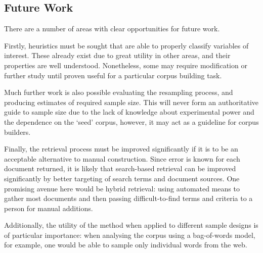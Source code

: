 





%
%




\subsection{Future Work}

There are a number of areas with clear opportunities for future work.

Firstly, heuristics must be sought that are able to properly classify variables of interest.  These already exist due to great utility in other areas, and their properties are well understood.  Nonetheless, some may require modification or further study until proven useful for a particular corpus building task.

Much further work is also possible evaluating the resampling process, and producing estimates of required sample size.  This will never form an authoritative guide to sample size due to the lack of knowledge about experimental power and the dependence on the `seed' corpus, however, it may act as a guideline for corpus builders.

Finally, the retrieval process must be improved significantly if it is to be an acceptable alternative to manual construction.  Since error is known for each document returned, it is likely that search-based retrieval can be improved significantly by better targeting of search terms and document sources.  One promising avenue here would be hybrid retrieval: using automated means to gather most documents and then passing difficult-to-find terms and criteria to a person for manual additions.

Additionally, the utility of the method when applied to different sample designs is of particular importance: when analysing the corpus using a bag-of-words model, for example, one would be able to sample only individual words from the web.







